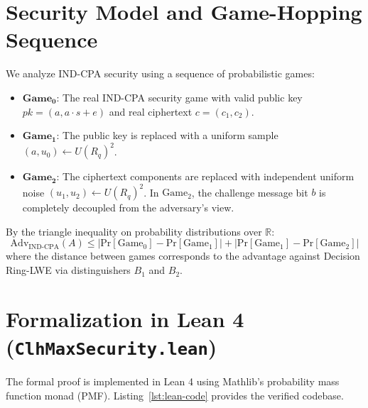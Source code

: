 \documentclass[11pt,a4paper]{article}
\begin{document}
\section{Security Model and Game-Hopping Sequence}
We analyze IND-CPA security using a sequence of probabilistic games:
\begin{itemize}
    \item $\mathbf{\text{Game}_0}$: The real IND-CPA security game with valid public key $pk = (a, a \cdot s + e)$ and real ciphertext $c = (c_1, c_2)$.
    \item $\mathbf{\text{Game}_1}$: The public key is replaced with a uniform sample $(a, u_0) \leftarrow U(R_q)^2$.
    \item $\mathbf{\text{Game}_2}$: The ciphertext components are replaced with independent uniform noise $(u_1, u_2) \leftarrow U(R_q)^2$. In $\text{Game}_2$, the challenge message bit $b$ is completely decoupled from the adversary's view.
\end{itemize}

By the triangle inequality on probability distributions over $\mathbb{R}$:
\[
\text{Adv}_{\text{IND-CPA}}(A) \le |\text{Pr}[\text{Game}_0] - \text{Pr}[\text{Game}_1]| + |\text{Pr}[\text{Game}_1] - \text{Pr}[\text{Game}_2]|
\]
where the distance between games corresponds to the advantage against Decision Ring-LWE via distinguishers $B_1$ and $B_2$.

\section{Formalization in Lean 4 (\texttt{ClhMaxSecurity.lean})}

The formal proof is implemented in Lean 4 using \textsf{Mathlib}'s probability mass function monad (\textsf{PMF}). Listing~\ref{lst:lean-code} provides the verified codebase.
\end{document}
